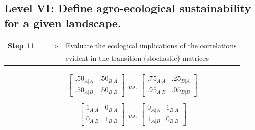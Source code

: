 \documentclass[
paper=128mm:96mm, %
fontsize=11pt, %
pagesize, %
parskip=half-, %
]{scrartcl} %
\theoremstyle{mythmstyle} %
\begin{document}
\clearpage
\subsection{Level VI: Define agro-ecological sustainability for a given landscape.}
\footnotesize 
\begin{tabular}{lll}
	\textbf{Step 11} & ==> & Evaluate the ecological implications of the correlations \\
	& & evident in the transition (stochastic) matrices
\end{tabular}

\begin{equation*}
\begin{aligned}
\begin{bmatrix}
	.50_{A|A} & .50_{B|A}\\
	.50_{A|B} & .50_{B|B}
\end{bmatrix}\\
\end{aligned}
vs.
\begin{aligned}
\begin{bmatrix}
	.75_{A|A} & .25_{B|A}\\
	.95_{A|B} & .05_{B|B}
\end{bmatrix}\\
\end{aligned}
\end{equation*}
\begin{equation*}
\begin{aligned}
\begin{bmatrix}
	1_{A|A} & 0_{B|A}\\
	0_{A|B} & 1_{B|B}
\end{bmatrix}\\
\end{aligned}
vs.
\begin{aligned}
\begin{bmatrix}
	0_{A|A} & 1_{B|A}\\
	1_{A|B} & 0_{B|B}
\end{bmatrix}\\
\end{aligned}
\end{equation*}

\clearpage
\end{document}
